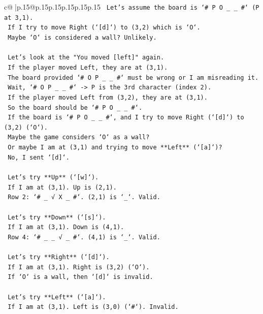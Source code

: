 \documentclass{article}
\begin{document}
{\begin{supertabular}{c@{$\;$}|p{.15\linewidth}@{}p{.15\linewidth}p{.15\linewidth}p{.15\linewidth}p{.15\linewidth}p{.15\linewidth}}
{{{\texttt{    Let's assume the board is `\# P O \_ \_ \#` (P at 3,1).} \\
\texttt{    If I try to move Right (`{[}d{]}`) to (3,2) which is `O`.} \\
\texttt{    Maybe `O` is considered a wall? Unlikely.} \\
\\ 
\texttt{    Let's look at the "You moved {[}left{]}" again.} \\
\texttt{    If the player moved Left, they are at (3,1).} \\
\texttt{    The board provided `\# O P \_ \_ \#` must be wrong or I am misreading it.} \\
\texttt{    Wait, `\# O P \_ \_ \#` {-}> P is the 3rd character (index 2).} \\
\texttt{    If the player moved Left from (3,2), they are at (3,1).} \\
\texttt{    So the board should be `\# P O \_ \_ \#`.} \\
\texttt{    If the board is `\# P O \_ \_ \#`, and I try to move Right (`{[}d{]}`) to (3,2) (`O`).} \\
\texttt{    Maybe the game considers `O` as a wall?} \\
\texttt{    Or maybe I am at (3,1) and trying to move **Left** (`{[}a{]}`)?} \\
\texttt{    No, I sent `{[}d{]}`.} \\
\\ 
\texttt{    Let's try **Up** (`{[}w{]}`).} \\
\texttt{    If I am at (3,1). Up is (2,1).} \\
\texttt{    Row 2: `\# \_ √ X \_ \#`. (2,1) is `\_`. Valid.} \\
\\ 
\texttt{    Let's try **Down** (`{[}s{]}`).} \\
\texttt{    If I am at (3,1). Down is (4,1).} \\
\texttt{    Row 4: `\# \_ \_ √ \_ \#`. (4,1) is `\_`. Valid.} \\
\\ 
\texttt{    Let's try **Right** (`{[}d{]}`).} \\
\texttt{    If I am at (3,1). Right is (3,2) (`O`).} \\
\texttt{    If `O` is a wall, then `{[}d{]}` is invalid.} \\
\\ 
\texttt{    Let's try **Left** (`{[}a{]}`).} \\
\texttt{    If I am at (3,1). Left is (3,0) (`\#`). Invalid.} \\
}}}
\end{supertabular}}
\end{document}
